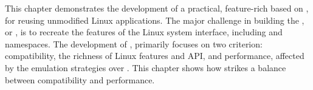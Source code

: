 This chapter
demonstrates the development of a practical, feature-rich \libos{} based on
\thehostabi{},
for reusing unmodified Linux applications.
The major challenge in building the \libos{},
or \thelibos{},
is to recreate the features of the Linux system interface, including
\linuxapis{} and namespaces. %
The development of \thelibos{},
primarily focuses on two criterion:
compatibility, the richness of Linux features and API,
and performance, affected by
the emulation strategies over \thehostabi{}.
This chapter shows how \thelibos{} strikes a balance between compatibility and performance.





